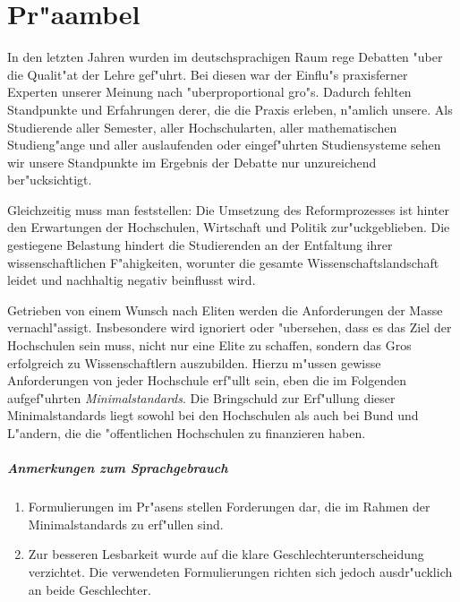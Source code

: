 \chapter*{Pr"aambel}
\thispagestyle{fancy}

In den letzten Jahren wurden im deutschsprachigen Raum rege
Debatten "uber die Qualit"at der Lehre gef"uhrt.
Bei diesen war der Einflu"s praxisferner Experten unserer Meinung nach "uberproportional gro"s.
Dadurch fehlten Standpunkte und Erfahrungen derer, die
die Praxis erleben, n"amlich unsere. Als Studierende
aller Semester, aller Hochschularten, aller mathematischen Studieng"ange
und aller auslaufenden oder eingef"uhrten Studiensysteme sehen
wir unsere Standpunkte im Ergebnis der Debatte nur unzureichend
ber"ucksichtigt.

Gleichzeitig muss man feststellen: Die Umsetzung des Reformprozesses
ist hinter den Erwartungen der Hochschulen, Wirtschaft und Politik
zur"uckgeblieben. Die gestiegene Belastung hindert die Studierenden
an der Entfaltung ihrer wissenschaftlichen F"ahigkeiten, worunter
die gesamte Wissenschaftslandschaft leidet und nachhaltig negativ
beinflusst wird.

Getrieben von einem Wunsch nach Eliten werden die Anforderungen der
Masse vernachl"assigt. Insbesondere wird ignoriert oder "ubersehen,
dass es das Ziel der Hochschulen sein muss, nicht nur eine Elite zu
schaffen, sondern das Gros erfolgreich zu Wissenschaftlern auszubilden.
Hierzu m"ussen gewisse Anforderungen von jeder Hochschule erf"ullt
sein, eben die im Folgenden aufgef"uhrten \emph{Minimalstandards}.
Die Bringschuld zur Erf"ullung dieser Minimalstandards liegt sowohl
bei den Hochschulen als auch bei Bund und L"andern, die die
"offentlichen Hochschulen zu finanzieren haben.

\paragraph{Anmerkungen zum Sprachgebrauch}\begin{enumerate}
\item Formulierungen im Pr"asens stellen Forderungen dar, die im
	Rahmen der Minimalstandards zu erf"ullen sind.
\item Zur besseren Lesbarkeit wurde auf die klare Geschlechterunterscheidung
	verzichtet. Die verwendeten Formulierungen richten sich
	jedoch ausdr"ucklich an beide Geschlechter.
\end{enumerate}

